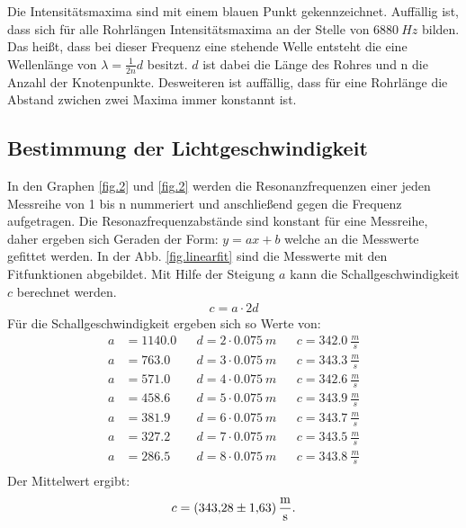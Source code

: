 Die Intensitätsmaxima sind mit einem blauen Punkt gekennzeichnet.
Auffällig ist, dass sich für alle Rohrlängen Intensitätsmaxima an der Stelle von $\SI{6880}{Hz}$ bilden. Das heißt, dass bei dieser Frequenz eine stehende Welle entsteht die eine Wellenlänge von $\lambda=\frac{1}{2n}d$ besitzt.
$d$ ist dabei die Länge des Rohres und n die Anzahl der Knotenpunkte.
Desweiteren ist auffällig, dass für eine Rohrlänge die Abstand zwichen zwei Maxima immer konstannt ist.

\subsection{Bestimmung der Lichtgeschwindigkeit}
In den Graphen \ref{fig.2} und \ref{fig.2} werden die Resonanzfrequenzen einer jeden Messreihe von 1 bis n nummeriert und anschließend gegen die Frequenz aufgetragen.
Die Resonazfrequenzabstände sind konstant für eine Messreihe, daher ergeben sich Geraden der Form: $y=ax+b$ welche an die Messwerte gefittet werden.
In der Abb. \ref{fig.linearfit} sind die Messwerte mit den Fitfunktionen abgebildet.
Mit Hilfe der Steigung $a$ kann die Schallgeschwindigkeit $c$ berechnet werden.
\begin{align*}
  c = a\cdot2d
\end{align*}
Für die Schallgeschwindigkeit ergeben sich so Werte von:
\begin{align*}
a &= 1140.0 && d = 2\cdot\SI{0.075}{m} && c=\SI{342.0}{\frac{m}{s}}\\
a &= 763.0  && d = 3\cdot\SI{0.075}{m} && c=\SI{343.3}{\frac{m}{s}}\\
a &= 571.0  && d = 4\cdot\SI{0.075}{m} && c=\SI{342.6}{\frac{m}{s}}\\
a &= 458.6  && d = 5\cdot\SI{0.075}{m} && c=\SI{343.9}{\frac{m}{s}}\\
a &= 381.9  && d = 6\cdot\SI{0.075}{m} && c=\SI{343.7}{\frac{m}{s}}\\
a &= 327.2  && d = 7\cdot\SI{0.075}{m} && c=\SI{343.5}{\frac{m}{s}}\\
a &= 286.5  && d = 8\cdot\SI{0.075}{m} && c=\SI{343.8}{\frac{m}{s}}\\
\end{align*}
Der Mittelwert ergibt:
\begin{align*}
  c=\SI{343.28\pm1.63}{\frac{m}{s}}.
\end{align*}

